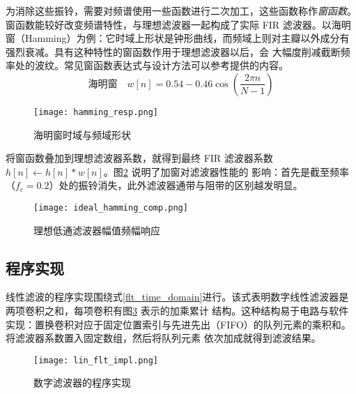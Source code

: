 为消除这些振铃，需要对频谱使用一些函数进行二次加工，这些函数称作\emph{窗函数}。窗函数能较好改变频谱特性，与理想滤波器一起构成了实际 FIR
滤波器。以海明窗（Hamming）为例：它时域上形状是钟形曲线，而频域上则对主瓣以外成分有强烈衰减。具有这种特性的窗函数作用于理想滤波器以后，会
大幅度削减截断频率处的波纹。常见窗函数表达式与设计方法可以参考\cite[\href{https://ccrma.stanford.edu/~jos}{JULIUS O. SMITH III}]
{smith2007introduction}提供的内容。
$$\textrm{海明窗}\quad w[n]=0.54-0.46\cos(\frac{2\pi n}{N-1})$$
\begin{figure}[htbp]
    \centering\label{hamming_resp}
    \texttt{[image: hamming\_resp.png]}
    \caption{海明窗时域与频域形状}
\end{figure}

将窗函数叠加到理想滤波器系数，就得到最终 FIR 滤波器系数 $h[n]\leftarrow h[n]*w[n]$。图\ref{ideal_hamming_comp} 说明了加窗对滤波器性能的
影响：首先是截至频率（$f_c=0.2$）处的振铃消失，此外滤波器通带与阻带的区别越发明显。
\begin{figure}[htb]
    \centering\label{ideal_hamming_comp}
    \texttt{[image: ideal\_hamming\_comp.png]}
    \caption{理想低通滤波器幅值频幅响应}
\end{figure}
\newpage

\subsection{程序实现}
线性滤波的程序实现围绕式\ref{flt_time_domain}进行。该式表明数字线性滤波器是两项卷积之和，每项卷积有图\ref{lin_flt_impl} 表示的加乘累计
结构。这种结构易于电路与软件实现：置换卷积对应于固定位置索引与先进先出（FIFO）的队列元素的乘积和。将滤波器系数置入固定数组，然后将队列元素
依次加成就得到滤波结果。
\begin{figure}[!h]
    \centering\label{lin_flt_impl}
    \texttt{[image: lin\_flt\_impl.png]}
    \caption{数字滤波器的程序实现}
\end{figure}

